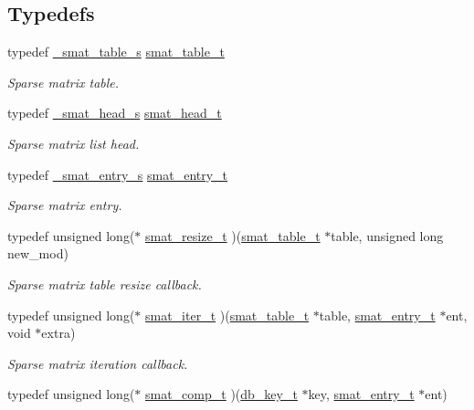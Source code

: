\subsection*{Typedefs}
\begin{CompactItemize}
\item 
typedef \hyperlink{struct__smat__table__s}{\_\-smat\_\-table\_\-s} \hyperlink{group__dbprim__smat_ga0}{smat\_\-table\_\-t}
\begin{CompactList}\small\item\em Sparse matrix table. \item\end{CompactList}\item 
typedef \hyperlink{struct__smat__head__s}{\_\-smat\_\-head\_\-s} \hyperlink{group__dbprim__smat_ga1}{smat\_\-head\_\-t}
\begin{CompactList}\small\item\em Sparse matrix list head. \item\end{CompactList}\item 
typedef \hyperlink{struct__smat__entry__s}{\_\-smat\_\-entry\_\-s} \hyperlink{group__dbprim__smat_ga2}{smat\_\-entry\_\-t}
\begin{CompactList}\small\item\em Sparse matrix entry. \item\end{CompactList}\item 
typedef unsigned long($\ast$ \hyperlink{group__dbprim__smat_ga3}{smat\_\-resize\_\-t} )(\hyperlink{struct__smat__table__s}{smat\_\-table\_\-t} $\ast$table, unsigned long new\_\-mod)
\begin{CompactList}\small\item\em Sparse matrix table resize callback. \item\end{CompactList}\item 
typedef unsigned long($\ast$ \hyperlink{group__dbprim__smat_ga4}{smat\_\-iter\_\-t} )(\hyperlink{struct__smat__table__s}{smat\_\-table\_\-t} $\ast$table, \hyperlink{struct__smat__entry__s}{smat\_\-entry\_\-t} $\ast$ent, void $\ast$extra)
\begin{CompactList}\small\item\em Sparse matrix iteration callback. \item\end{CompactList}\item 
typedef unsigned long($\ast$ \hyperlink{group__dbprim__smat_ga5}{smat\_\-comp\_\-t} )(\hyperlink{struct__db__key__s}{db\_\-key\_\-t} $\ast$key, \hyperlink{struct__smat__entry__s}{smat\_\-entry\_\-t} $\ast$ent)

\end{CompactItemize}
